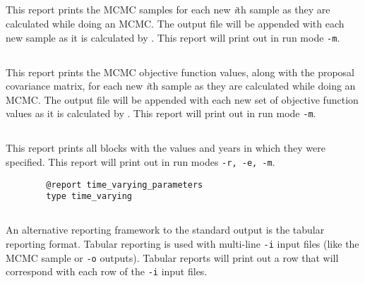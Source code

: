 \subsection{}

This report prints the MCMC samples for each new \textit{i}th sample as they are calculated while doing an MCMC. The output file will be appended with each new sample as it is calculated by \CNAME. This report will print out in run mode \texttt{-m}.

\subsection{}

This report prints the MCMC objective function values, along with the proposal covariance matrix, for each new \textit{i}th sample as they are calculated while doing an MCMC. The output file will be appended with each new set of objective function values as it is calculated by \CNAME. This report will print out in run mode \texttt{-m}.

\subsection{}

This report prints all  blocks with the values and years in which they were specified. This report will print out in run modes \texttt{-r, -e, -m}.

{\small{\begin{verbatim}
		@report time_varying_parameters
		type time_varying
		\end{verbatim}}}

\subsection{}\label{sub:tabular}

An alternative reporting framework to the standard output is the tabular reporting format. Tabular reporting is used with multi-line \texttt{-i} input files (like the MCMC sample or \texttt{-o} outputs). Tabular reports will print out a row that will correspond with each row of the \texttt{-i} input files.

